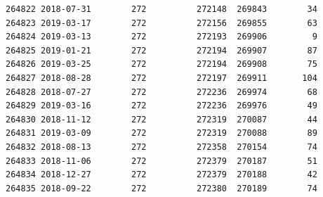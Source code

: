 \documentclass[11pt]{article}
\begin{document}
\begin{tcolorbox}[breakable, size=fbox, boxrule=.5pt, pad at break*=1mm, opacityfill=0]
\begin{Verbatim}[commandchars=\\\{\}]
264822 2018-07-31        272          272148  269843        34
264823 2019-03-17        272          272156  269855        63
264824 2019-03-13        272          272193  269906         9
264825 2019-01-21        272          272194  269907        87
264826 2019-03-25        272          272194  269908        75
264827 2018-08-28        272          272197  269911       104
264828 2018-07-27        272          272236  269974        68
264829 2019-03-16        272          272236  269976        49
264830 2018-11-12        272          272319  270087        44
264831 2019-03-09        272          272319  270088        89
264832 2018-08-13        272          272358  270154        74
264833 2018-11-06        272          272379  270187        51
264834 2018-12-27        272          272379  270188        42
264835 2018-09-22        272          272380  270189        74


\end{Verbatim}
\end{tcolorbox}
\end{document}
